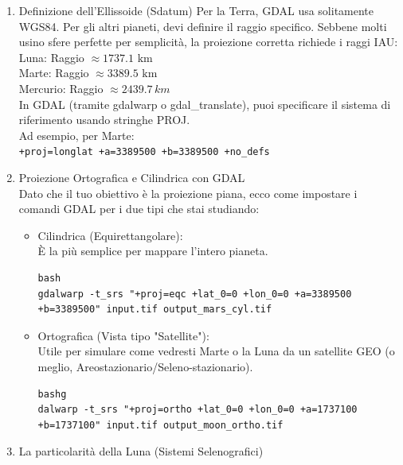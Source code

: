 \documentclass[a4paper,14pt]{article}
\begin{document}
\begin{enumerate}
\item Definizione dell'Ellissoide (Sdatum)
Per la Terra, GDAL usa solitamente WGS84. Per gli altri pianeti, devi definire il raggio specifico. Sebbene molti usino sfere perfette per semplicità, la proiezione corretta richiede i raggi IAU:\\
Luna: Raggio \(\approx 1737.1\text{\ km}\)\\
Marte: Raggio \(\approx 3389.5\text{\ km}\)\\
Mercurio: Raggio \(\approx 2439.7\,km\)\\
In GDAL (tramite gdalwarp o gdal\_translate), puoi specificare il sistema di riferimento usando stringhe PROJ.\\
Ad esempio, per Marte:\\
\verb|+proj=longlat +a=3389500 +b=3389500 +no_defs|\\
\item Proiezione Ortografica e Cilindrica con GDAL\\
Dato che il tuo obiettivo è la proiezione piana, ecco come impostare i comandi GDAL per i due tipi che stai studiando:\\
\begin{itemize}
\item Cilindrica (Equirettangolare):\\
È la più semplice per mappare l'intero pianeta.
{
\scriptsize
\begin{verbatim}
bash
gdalwarp -t_srs "+proj=eqc +lat_0=0 +lon_0=0 +a=3389500 +b=3389500" input.tif output_mars_cyl.tif                                                                                                \end{verbatim}
}
\item Ortografica (Vista tipo "Satellite"): \\
Utile per simulare come vedresti Marte o la Luna da un satellite GEO (o meglio, Areostazionario/Seleno-stazionario).\\
{
\scriptsize
\begin{verbatim}
bashg
dalwarp -t_srs "+proj=ortho +lat_0=0 +lon_0=0 +a=1737100 +b=1737100" input.tif output_moon_ortho.tif                                                                                                    \end{verbatim}
}
\end{itemize}
\item La particolarità della Luna (Sistemi Selenografici)\\

\end{enumerate}
\end{document}
